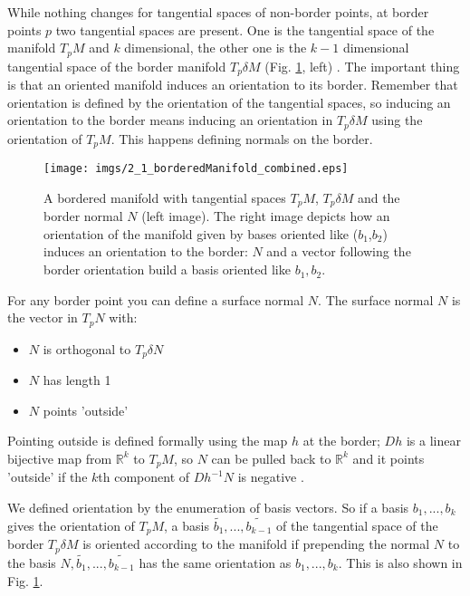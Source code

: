 While nothing changes for tangential spaces of non-border points, at border points $p$ two tangential spaces are present. One is the tangential space of the manifold $T_pM$ and $k$ dimensional, the other one is the $k-1$ dimensional tangential space of the border manifold $T_p \delta M$ (Fig. \ref{fig::2_1_borderManifold}, left) . The important thing is that an oriented manifold induces an orientation to its border. Remember that orientation is defined by the orientation of the tangential spaces, so inducing an orientation to the border means inducing an orientation in $T_p\delta M$ using the orientation of $T_p M$. This happens defining normals on the border.

\begin{figure}
\begin{center}
\texttt{[image: imgs/2\_1\_borderedManifold\_combined.eps]}
\end{center}
\label{fig::2_1_borderManifold}
\caption{A bordered manifold with tangential spaces $T_pM$, $T_p\delta M$ and the border normal $N$ (left image). The right image depicts how an orientation of the manifold given by bases oriented like ($b_1$,$b_2$) induces an orientation to the border: $N$ and a vector following the border orientation build a basis oriented like $b_1,b_2$.}
\end{figure}

For any border point you can define a surface normal $N$. The surface normal $N$ is the vector in $T_p N$ with:
\begin{itemize}
\item $N$ is orthogonal to $T_p \delta N$
\item $N$ has length 1
\item $N$ points 'outside'
\end{itemize}
Pointing outside is defined formally using the map $h$ at the border; $Dh$ is a linear bijective map from $\mathbb R^k$ to $T_pM$, so $N$ can be pulled back to $\mathbb R^k$ and it points 'outside' if the $k$th component of $Dh^{-1} N$ is negative .

We defined orientation by the enumeration of basis vectors. So if a basis $b_1,...,b_k$ gives the orientation of $T_pM$,
a basis $\widetilde{b_1},...,\widetilde{ b_{k-1}}$ of the tangential space of the border $T_p\delta M$ is oriented according to the manifold if prepending the normal $N$ to the basis $N,\widetilde{b_1},...,\widetilde{ b_{k-1}}$ has the same orientation as $b_1,...,b_k$. This is also shown in Fig. \ref{fig::2_1_borderManifold}.



